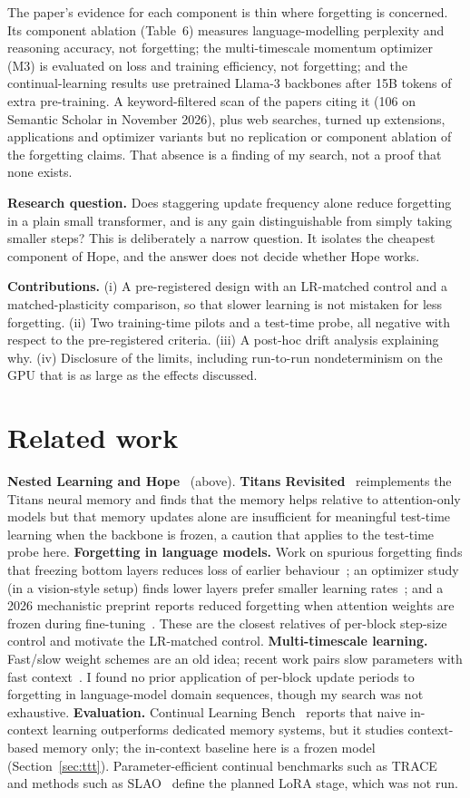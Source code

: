 \documentclass[10pt]{article}
\begin{document}
The paper's evidence for each component is thin where forgetting is concerned. Its component ablation (Table~6)
measures language-modelling perplexity and reasoning accuracy, not forgetting; the multi-timescale momentum optimizer (M3) is evaluated on
loss and training efficiency, not forgetting; and the continual-learning results use pretrained Llama-3 backbones after 15B tokens of extra
pre-training. A keyword-filtered scan of the papers citing it (106 on Semantic Scholar in November 2026), plus web searches, turned up
extensions, applications and optimizer variants but no replication or component ablation of the forgetting claims.
That absence is a finding of my search, not a proof that none exists.

\textbf{Research question.} Does staggering update frequency alone reduce forgetting in a plain small transformer, and is any
gain distinguishable from simply taking smaller steps? This is deliberately a narrow question. It isolates the cheapest component of Hope,
and the answer does not decide whether Hope works.

\textbf{Contributions.} (i) A pre-registered design with an LR-matched control and a matched-plasticity comparison, so that
slower learning is not mistaken for less forgetting. (ii) Two training-time pilots and a test-time probe, all negative with respect to the pre-registered
criteria. (iii) A post-hoc drift analysis explaining why. (iv) Disclosure of the limits, including run-to-run nondeterminism on the
GPU that is as large as the effects discussed.

\section{Related work}
\textbf{Nested Learning and Hope}~\cite{nl} (above). \textbf{Titans Revisited}~\cite{titans} reimplements the Titans neural
memory and finds that the memory helps relative to attention-only models but that memory updates alone are insufficient for meaningful test-time
learning when the backbone is frozen, a caution that applies to the test-time probe here.
\textbf{Forgetting in language models.} Work on spurious forgetting finds that freezing bottom layers reduces loss of earlier
behaviour~\cite{spurious}; an optimizer study (in a vision-style setup) finds lower layers prefer smaller learning rates~\cite{resampling}; and a 2026 mechanistic preprint reports reduced forgetting when attention
weights are frozen during fine-tuning~\cite{mech}. These are the closest relatives of per-block step-size control and motivate
the LR-matched control. \textbf{Multi-timescale learning.} Fast/slow weight schemes are an old idea; recent work pairs slow parameters with fast
context~\cite{fastslow}. I found no prior application of per-block update periods to forgetting in language-model domain sequences,
though my search was not exhaustive. \textbf{Evaluation.} Continual Learning Bench~\cite{clbench} reports that naive in-context learning
outperforms dedicated memory systems, but it studies context-based memory only; the in-context baseline here is a frozen model (Section~\ref{sec:ttt}).
Parameter-efficient continual benchmarks such as TRACE~\cite{trace} and methods such as SLAO~\cite{slao} define the planned LoRA stage, which was not run.
\end{document}
